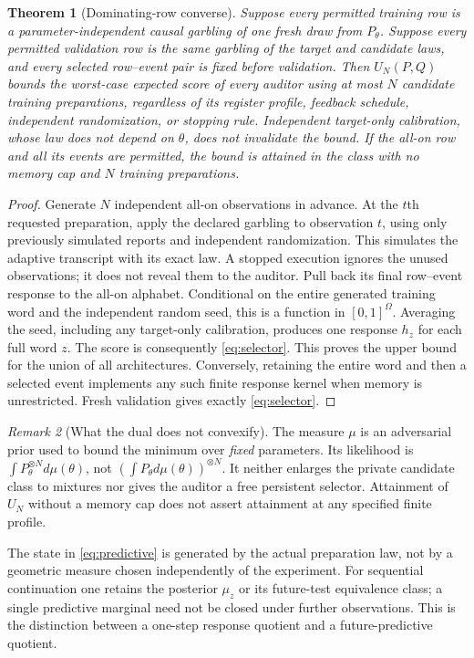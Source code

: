 \documentclass[11pt]{amsart}
\newtheorem{theorem}{Theorem}[section]
\theoremstyle{definition}\newtheorem{definition}[theorem]{Definition}
\theoremstyle{remark}\newtheorem{remark}[theorem]{Remark}
\newcommand{\1}{\mathbf 1}
\begin{document}
\begin{theorem}[Dominating-row converse]\label{thm:outer}
Suppose every permitted training row is a parameter-independent causal
garbling of one fresh draw from $P_\theta$. Suppose every permitted
validation row is the same garbling of the target and candidate laws,
and every selected row--event pair is fixed before validation. Then
$U_N(P,Q)$ bounds the worst-case expected score of every auditor using
at most $N$ candidate training preparations, regardless of its register
profile, feedback schedule, independent randomization, or stopping rule.
Independent target-only calibration, whose law does not depend on
$\theta$, does not invalidate the bound. If the all-on row and all its
events are permitted, the bound is attained in the class with no memory
cap and $N$ training preparations.
\end{theorem}
\begin{proof}
Generate $N$ independent all-on observations in advance. At the $t$th
requested preparation, apply the declared garbling to observation $t$,
using only previously simulated reports and independent randomization.
This simulates the adaptive transcript with its exact law. A stopped
execution ignores the unused observations; it does not reveal them to
the auditor. Pull back its final row--event response to the all-on
alphabet. Conditional on the entire generated training word and the
independent random seed, this is a function in $[0,1]^\Omega$.
Averaging the seed, including any target-only calibration, produces one
response $h_z$ for each full word $z$. The score is consequently
\eqref{eq:selector}. This proves the upper bound for the union of all
architectures. Conversely, retaining the entire word and then a selected
event implements any such finite response kernel when memory is
unrestricted. Fresh validation gives exactly \eqref{eq:selector}.
\end{proof}

\begin{remark}[What the dual does not convexify]
The measure $\mu$ is an adversarial prior used to bound the minimum over
\emph{fixed} parameters. Its likelihood is
$\int P_\theta^{\otimes N}d\mu(\theta)$, not
$(\int P_\theta d\mu(\theta))^{\otimes N}$. It neither enlarges the
private candidate class to mixtures nor gives the auditor a free
persistent selector. Attainment of $U_N$ without a memory cap does not
assert attainment at any specified finite profile.
\end{remark}

The state in \eqref{eq:predictive} is generated by the actual preparation
law, not by a geometric measure chosen independently of the experiment.
For sequential continuation one retains the posterior $\mu_z$ or its
future-test equivalence class; a single predictive marginal need not be
closed under further observations. This is the distinction between a
one-step response quotient and a future-predictive quotient.
\end{document}

